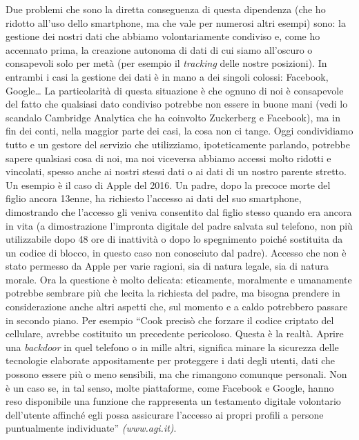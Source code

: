 Due problemi che sono la diretta conseguenza di questa dipendenza (che ho ridotto all’uso dello smartphone, ma che vale per numerosi altri esempi) sono: la gestione dei nostri dati che abbiamo volontariamente condiviso e, come ho accennato prima, la creazione autonoma di dati di cui siamo all’oscuro o consapevoli solo per metà (per esempio il \textit{tracking} delle nostre posizioni).
In entrambi i casi la gestione dei dati è in mano a dei singoli colossi: Facebook, Google…
La particolarità di questa situazione è che ognuno di noi è consapevole del fatto che qualsiasi dato condiviso potrebbe non essere in buone mani (vedi lo scandalo Cambridge Analytica che ha coinvolto Zuckerberg e Facebook), ma in fin dei conti, nella maggior parte dei casi, la cosa non ci tange. 
Oggi condividiamo tutto e un gestore del servizio che utilizziamo, ipoteticamente parlando, potrebbe sapere qualsiasi cosa di noi, ma noi viceversa abbiamo accessi molto ridotti e vincolati, spesso anche ai nostri stessi dati o ai dati di un nostro parente stretto. 
Un esempio è il caso di Apple del 2016. Un padre, dopo la precoce morte del figlio ancora 13enne, ha richiesto l’accesso ai dati del suo smartphone, dimostrando che l’accesso gli veniva consentito dal figlio stesso quando era ancora in vita (a dimostrazione l’impronta digitale del padre salvata sul telefono, non più utilizzabile dopo 48 ore di inattività o dopo lo spegnimento poiché sostituita da un codice di blocco, in questo caso non conosciuto dal padre). Accesso che non è stato permesso da Apple per varie ragioni, sia di natura legale, sia di natura morale. Ora la questione è molto delicata: eticamente, moralmente e umanamente potrebbe sembrare più che lecita la richiesta del padre, ma bisogna prendere in considerazione anche altri aspetti che, sul momento e a caldo potrebbero passare in secondo piano. Per esempio “Cook precisò che forzare il codice criptato del cellulare, avrebbe costituito un precedente pericoloso. Questa è la realtà. Aprire una \textit{backdoor} in quel telefono o in mille altri, significa minare la sicurezza delle tecnologie elaborate appositamente per proteggere i dati degli utenti, dati che possono essere più o meno sensibili, ma che rimangono comunque personali. Non è un caso se, in tal senso, molte piattaforme, come Facebook e Google, hanno reso disponibile una funzione che rappresenta un testamento digitale volontario dell’utente affinché egli possa assicurare l’accesso ai propri profili a persone puntualmente individuate” \textit{(www.agi.it)}.
